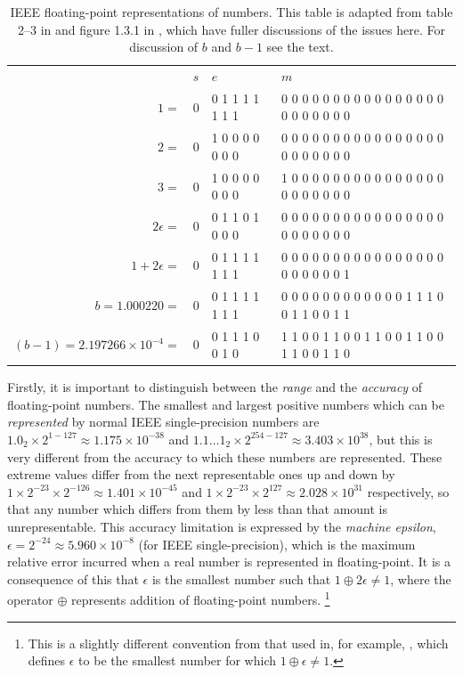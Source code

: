 \documentclass[11pt,oneside,chapters]{starlink}
\begin{document}
\begin{table}
\caption{IEEE floating-point representations of numbers.
This table is adapted from table 2--3 in \citet{sunncg} and figure 1.3.1
in \citet{nr}, which have fuller discussions of the issues here.  For
discussion of $b$ and $b-1$ see the text.
\label{f:fp}}
\begin{tabular}{rlll}
                                  & $s$ & $e$             & $m$                                           \\
$1=$                              & 0   & 0 1 1 1 1 1 1 1 & 0 0 0 0 0 0 0 0 0 0 0 0 0 0 0 0 0 0 0 0 0 0 0 \\
$2=$                              & 0   & 1 0 0 0 0 0 0 0 & 0 0 0 0 0 0 0 0 0 0 0 0 0 0 0 0 0 0 0 0 0 0 0 \\
$3=$                              & 0   & 1 0 0 0 0 0 0 0 & 1 0 0 0 0 0 0 0 0 0 0 0 0 0 0 0 0 0 0 0 0 0 0 \\
$2\epsilon=$                      & 0   & 0 1 1 0 1 0 0 0 & 0 0 0 0 0 0 0 0 0 0 0 0 0 0 0 0 0 0 0 0 0 0 0 \\
$1+2\epsilon=$                    & 0   & 0 1 1 1 1 1 1 1 & 0 0 0 0 0 0 0 0 0 0 0 0 0 0 0 0 0 0 0 0 0 0 1 \\
$b = 1.000220 =$                  & 0   & 0 1 1 1 1 1 1 1 & 0 0 0 0 0 0 0 0 0 0 0 0 1 1 1 0 0 1 1 0 0 1 1 \\
$(b-1) = 2.197266\times10^{-4} =$ & 0   & 0 1 1 1 0 0 1 0 & 1 1 0 0 1 1 0 0 1 1 0 0 1 1 0 0 1 1 0 0 1 1 0 \\
\end{tabular}
\end{table}

Firstly, it is important to distinguish between the
\emph{range} and the \emph{accuracy} of
floating-point numbers.  The smallest and largest
positive numbers which can be \emph{represented} by
normal IEEE single-precision numbers are
$1.0_2\times2^{1-127}\approx1.175\times10^{-38}$
and
$1.1\dots1_2\times2^{254-127}\approx3.403\times10^{38}$,
but this is very different from the accuracy to which
these numbers are represented. These extreme values
differ from the next representable ones up and down by
$1\times2^{-23}\times2^{-126}\approx1.401\times10^{-45}$
and $1\times2^{-23}\times2^{127}\approx2.028\times10^{31}$
respectively, so that any number which differs from them
by less than that amount is unrepresentable.  This
accuracy limitation is expressed by the \emph{machine
epsilon}, $\epsilon=2^{-24}\approx5.960\times10^{-8}$
(for IEEE single-precision), which is the maximum
relative error incurred when a real number is
represented in floating-point.  It is a consequence of
this that $\epsilon$ is the
smallest number such that
$1\oplus2\epsilon\neq1$, where
the operator $\oplus$
represents addition of floating-point
numbers.
\footnote{This is a slightly different
convention from that used in, for example,
\citet{nr}, which defines
$\epsilon$ to be the smallest
number for which $1\oplus\epsilon\neq1$.}
\end{document}
